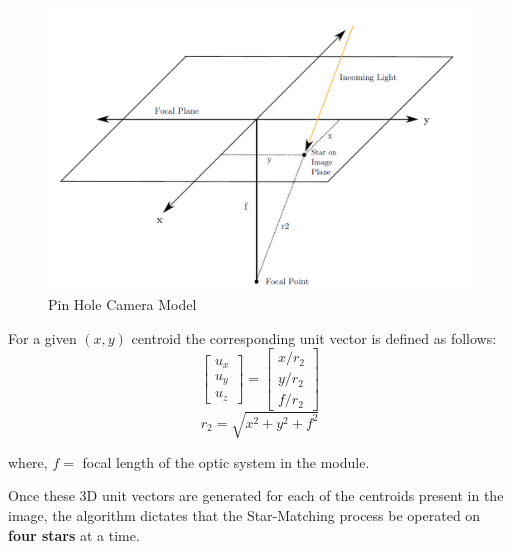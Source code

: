 \documentclass[../../main.tex]{subfiles}
\begin{document}
\begin{figure}[h!]
    \centering
    \includegraphics[scale=0.35]{Figures/GNC/pin_hole_camera_model.png}
    \caption{Pin Hole Camera Model}
    \label{fig:pin_hole_camera_model}
\end{figure}

For a given $(x, y)$ centroid the corresponding unit vector is defined as follows:
\begin{equation}
    \begin{bmatrix} u_{x} \\ u_{y} \\ u_{z} \end{bmatrix} = \begin{bmatrix} x/r_{2} \\ y/r_{2} \\ f/r_{2} \end{bmatrix}
\end{equation}
\begin{equation}
    r_{2} = \sqrt{x^2 + y^2 + f^2}
\end{equation}

where, $f = $ focal length of the optic system in the module.

Once these 3D unit vectors are generated for each of the centroids present in the image, the algorithm dictates that the Star-Matching process be operated on \textbf{four stars} at a time.
\end{document}
